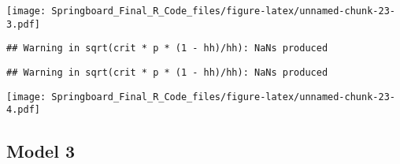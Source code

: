 \documentclass[]{article}
\newenvironment{Shaded}{\begin{snugshade}}{\end{snugshade}}
\newcommand{\KeywordTok}[1]{\textcolor[rgb]{0.13,0.29,0.53}{\textbf{#1}}}
\newcommand{\StringTok}[1]{\textcolor[rgb]{0.31,0.60,0.02}{#1}}
\newcommand{\CommentTok}[1]{\textcolor[rgb]{0.56,0.35,0.01}{\textit{#1}}}
\newcommand{\OperatorTok}[1]{\textcolor[rgb]{0.81,0.36,0.00}{\textbf{#1}}}
\newcommand{\NormalTok}[1]{#1}
\begin{document}
\texttt{[image: Springboard\_Final\_R\_Code\_files/figure-latex/unnamed-chunk-23-3.pdf]}

\begin{verbatim}
## Warning in sqrt(crit * p * (1 - hh)/hh): NaNs produced
\end{verbatim}

\begin{verbatim}
## Warning in sqrt(crit * p * (1 - hh)/hh): NaNs produced
\end{verbatim}

\texttt{[image: Springboard\_Final\_R\_Code\_files/figure-latex/unnamed-chunk-23-4.pdf]}

\subsection{Model 3}\label{model-3}

\begin{Shaded}
\end{Shaded}
\end{document}

